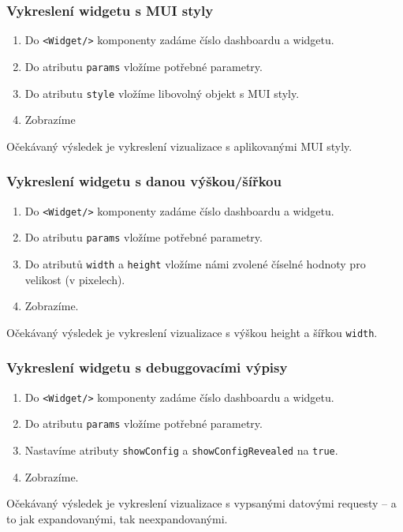 \documentclass[czech, bc, kiv, he, iso690numb]{fasthesis}
\begin{document}
\subsubsection{Vykreslení widgetu s MUI styly}
\begin{enumerate}
	\item Do \texttt{<Widget/>} komponenty zadáme číslo dashboardu a widgetu.
	\item Do atributu \texttt{params} vložíme potřebné parametry.
	\item Do atributu \texttt{style} vložíme libovolný objekt s MUI styly.
	\item Zobrazíme
\end{enumerate}
Očekávaný výsledek je vykreslení vizualizace s aplikovanými MUI styly.

\subsubsection{Vykreslení widgetu s danou výškou/šířkou}
\begin{enumerate}
	\item Do \texttt{<Widget/>} komponenty zadáme číslo dashboardu a widgetu.
	\item Do atributu \texttt{params} vložíme potřebné parametry.
	\item Do atributů \texttt{width} a \texttt{height} vložíme námi zvolené číselné hodnoty pro velikost (v pixelech).
	\item Zobrazíme.
\end{enumerate}
Očekávaný výsledek je vykreslení vizualizace s výškou {height} a šířkou \texttt{width}.

\subsubsection{Vykreslení widgetu s debuggovacími výpisy}
\begin{enumerate}
	\item Do \texttt{<Widget/>} komponenty zadáme číslo dashboardu a widgetu.
	\item Do atributu \texttt{params} vložíme potřebné parametry.
	\item Nastavíme atributy \texttt{showConfig} a \texttt{showConfigRevealed} na \texttt{true}.
	\item Zobrazíme.
\end{enumerate}
Očekávaný výsledek je vykreslení vizualizace s vypsanými datovými requesty – a to jak expandovanými, tak neexpandovanými.
\end{document}
